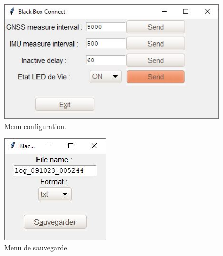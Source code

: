 \begin{figure}[h]
	\centering
	\includegraphics[width=.5\linewidth]{../figures/application/Config_window}
	\caption{Menu configuration.}
	\label{fig:configwindow}
\end{figure}

\begin{figure}[H]
	\centering
	\includegraphics[width=.2\linewidth]{../figures/application/scree_save}
	\caption{Menu de sauvegarde.}
	\label{fig:screesave}
\end{figure}






